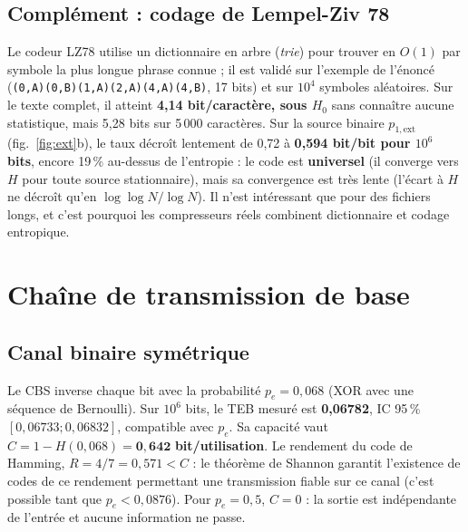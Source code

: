 \documentclass[10pt,a4paper]{article}
\newcommand{\code}[1]{\texttt{\small #1}}
\begin{document}
\subsection{Complément : codage de Lempel-Ziv 78}
Le codeur LZ78 utilise un dictionnaire en arbre (\textit{trie}) pour trouver en $O(1)$ par symbole la plus longue phrase connue ; il est validé sur l'exemple de l'énoncé (\code{(0,A)(0,B)(1,A)(2,A)(4,A)(4,B)}, 17 bits) et sur $10^4$ symboles aléatoires. Sur le texte complet, il atteint \textbf{4,14 bit/caractère, sous $H_0$} sans connaître aucune statistique, mais 5,28 bits sur 5\,000 caractères. Sur la source binaire $p_{1,\mathrm{ext}}$ (fig.~\ref{fig:ext}b), le taux décroît lentement de 0,72 à \textbf{0,594 bit/bit pour $10^6$ bits}, encore 19\,\% au-dessus de l'entropie : le code est \textbf{universel} (il converge vers $H$ pour toute source stationnaire), mais sa convergence est très lente (l'écart à $H$ ne décroît qu'en $\log\log N/\log N$). Il n'est intéressant que pour des fichiers longs, et c'est pourquoi les compresseurs réels combinent dictionnaire et codage entropique.

\section{Chaîne de transmission de base}
\subsection{Canal binaire symétrique}
Le CBS inverse chaque bit avec la probabilité $p_e = 0,068$ (XOR avec une séquence de Bernoulli). Sur $10^6$ bits, le TEB mesuré est \textbf{0,06782}, IC 95\,\% $[0,06733 ; 0,06832]$, compatible avec $p_e$. Sa capacité vaut $C = 1 - H(0,068) = \mathbf{0,642}$ \textbf{bit/utilisation}. Le rendement du code de Hamming, $R = 4/7 = 0,571 < C$ : le théorème de Shannon garantit l'existence de codes de ce rendement permettant une transmission fiable sur ce canal (c'est possible tant que $p_e < 0,0876$). Pour $p_e = 0,5$, $C = 0$ : la sortie est indépendante de l'entrée et aucune information ne passe.
\end{document}
